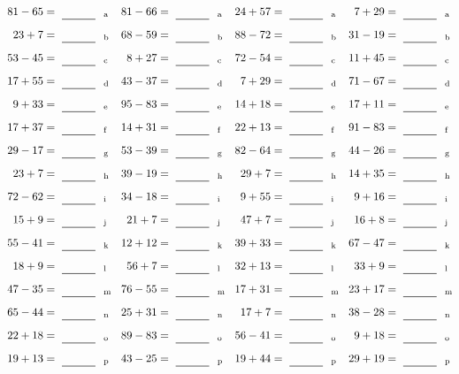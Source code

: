 \documentclass
[
  draft    = true,
  fontsize = 11pt,
  parskip  = half-
]
{scrartcl}
\begin{document}
\clearpage
\begin{align*}
    \pline{81-65}&=\rline{a}
  & \pline{81-66}&=\rline{a}
  & \pline{24+57}&=\rline{a}
  & \pline{7+29}&=\rline{a} \\[1ex]
    \pline{23+7}&=\rline{b}
  & \pline{68-59}&=\rline{b}
  & \pline{88-72}&=\rline{b}
  & \pline{31-19}&=\rline{b} \\[1ex]
    \pline{53-45}&=\rline{c}
  & \pline{8+27}&=\rline{c}
  & \pline{72-54}&=\rline{c}
  & \pline{11+45}&=\rline{c} \\[1ex]
    \pline{17+55}&=\rline{d}
  & \pline{43-37}&=\rline{d}
  & \pline{7+29}&=\rline{d}
  & \pline{71-67}&=\rline{d} \\[1ex]
    \pline{9+33}&=\rline{e}
  & \pline{95-83}&=\rline{e}
  & \pline{14+18}&=\rline{e}
  & \pline{17+11}&=\rline{e} \\[1ex]
    \pline{17+37}&=\rline{f}
  & \pline{14+31}&=\rline{f}
  & \pline{22+13}&=\rline{f}
  & \pline{91-83}&=\rline{f} \\[1ex]
    \pline{29-17}&=\rline{g}
  & \pline{53-39}&=\rline{g}
  & \pline{82-64}&=\rline{g}
  & \pline{44-26}&=\rline{g} \\[1ex]
    \pline{23+7}&=\rline{h}
  & \pline{39-19}&=\rline{h}
  & \pline{29+7}&=\rline{h}
  & \pline{14+35}&=\rline{h} \\[1ex]
    \pline{72-62}&=\rline{i}
  & \pline{34-18}&=\rline{i}
  & \pline{9+55}&=\rline{i}
  & \pline{9+16}&=\rline{i} \\[1ex]
    \pline{15+9}&=\rline{j}
  & \pline{21+7}&=\rline{j}
  & \pline{47+7}&=\rline{j}
  & \pline{16+8}&=\rline{j} \\[1ex]
    \pline{55-41}&=\rline{k}
  & \pline{12+12}&=\rline{k}
  & \pline{39+33}&=\rline{k}
  & \pline{67-47}&=\rline{k} \\[1ex]
    \pline{18+9}&=\rline{l}
  & \pline{56+7}&=\rline{l}
  & \pline{32+13}&=\rline{l}
  & \pline{33+9}&=\rline{l} \\[1ex]
    \pline{47-35}&=\rline{m}
  & \pline{76-55}&=\rline{m}
  & \pline{17+31}&=\rline{m}
  & \pline{23+17}&=\rline{m} \\[1ex]
    \pline{65-44}&=\rline{n}
  & \pline{25+31}&=\rline{n}
  & \pline{17+7}&=\rline{n}
  & \pline{38-28}&=\rline{n} \\[1ex]
    \pline{22+18}&=\rline{o}
  & \pline{89-83}&=\rline{o}
  & \pline{56-41}&=\rline{o}
  & \pline{9+18}&=\rline{o} \\[1ex]
    \pline{19+13}&=\rline{p}
  & \pline{43-25}&=\rline{p}
  & \pline{19+44}&=\rline{p}
  & \pline{29+19}&=\rline{p}
\end{align*}
\end{document}

